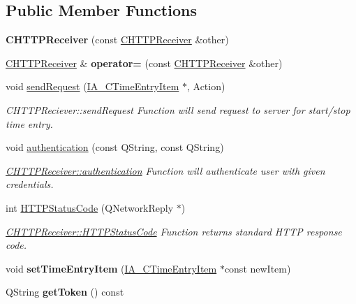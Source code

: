 \subsection*{Public Member Functions}
\begin{DoxyCompactItemize}
\item 
\mbox{\label{classCHTTPReceiver_a03a815d6a3bc709ce2c924c1599f6a8d}} 
{\bfseries C\+H\+T\+T\+P\+Receiver} (const \hyperlink{classCHTTPReceiver}{C\+H\+T\+T\+P\+Receiver} \&other)
\item 
\mbox{\label{classCHTTPReceiver_a5397eeb8a862ade2f083b149ebc3631e}} 
\hyperlink{classCHTTPReceiver}{C\+H\+T\+T\+P\+Receiver} \& {\bfseries operator=} (const \hyperlink{classCHTTPReceiver}{C\+H\+T\+T\+P\+Receiver} \&other)
\item 
void \hyperlink{classCHTTPReceiver_ac4b7a55951c7340bb2bf483e5b8dbf59}{send\+Request} (\hyperlink{classIA__CTimeEntryItem}{I\+A\+\_\+\+C\+Time\+Entry\+Item} $\ast$, Action)
\begin{DoxyCompactList}\small\item\em C\+H\+T\+T\+P\+Reciever\+::send\+Request Function will send request to server for start/stop time entry. \end{DoxyCompactList}\item 
void \hyperlink{classCHTTPReceiver_af4be4d5ce59a99993417786637f7cc64}{authentication} (const Q\+String, const Q\+String)
\begin{DoxyCompactList}\small\item\em \hyperlink{classCHTTPReceiver_af4be4d5ce59a99993417786637f7cc64}{C\+H\+T\+T\+P\+Receiver\+::authentication} Function will authenticate user with given credentials. \end{DoxyCompactList}\item 
int \hyperlink{classCHTTPReceiver_a0e79cd1e6bf464be0420de66685a3398}{H\+T\+T\+P\+Status\+Code} (Q\+Network\+Reply $\ast$)
\begin{DoxyCompactList}\small\item\em \hyperlink{classCHTTPReceiver_a0e79cd1e6bf464be0420de66685a3398}{C\+H\+T\+T\+P\+Receiver\+::\+H\+T\+T\+P\+Status\+Code} Function returns standard H\+T\+TP response code. \end{DoxyCompactList}\item 
\mbox{\label{classCHTTPReceiver_a2a0e30f3c03093c8ea8c262bfb984706}} 
void {\bfseries set\+Time\+Entry\+Item} (\hyperlink{classIA__CTimeEntryItem}{I\+A\+\_\+\+C\+Time\+Entry\+Item} $\ast$const new\+Item)
\item 
\mbox{\label{classCHTTPReceiver_a5ff4340ebb85af925dbb3edcab8ded8c}} 
Q\+String {\bfseries get\+Token} () const
\end{DoxyCompactItemize}
